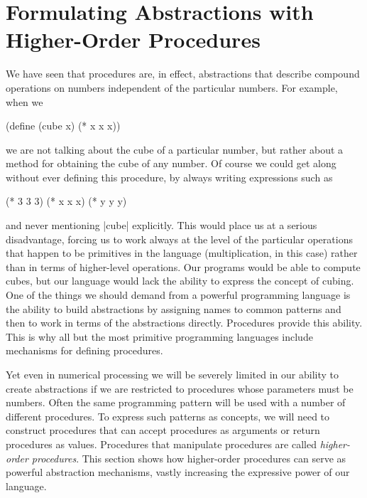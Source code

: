 
\section{Formulating Abstractions with Higher-Order Procedures}
\label{sec:1.3}




We have seen that procedures are, in effect, abstractions that describe
compound operations on numbers independent of the particular numbers.
For example, when we


\begin{schemedisplay}
(define (cube x) (* x x x))
\end{schemedisplay}
we are not talking about the cube of a particular number, but rather
about a method for obtaining the cube of any number.  Of course we
could get along without ever defining this procedure, by
always writing expressions such as

\begin{schemedisplay}
(* 3 3 3)
(* x x x)
(* y y y)        
\end{schemedisplay}
and never mentioning \scheme|cube| explicitly.  This would place us at
a serious disadvantage, forcing us to work always at the level of the
particular operations that happen to be primitives in the language
(multiplication, in this case) rather than in terms of higher-level
operations.  Our programs would be able to compute cubes, but our
language would lack the ability to express the concept of cubing.  One
of the things we should demand from a powerful programming language is
the ability to build abstractions by assigning names to common
patterns and then to work in terms of the abstractions directly.
Procedures provide this ability.  This is why all but the most
primitive programming languages include mechanisms for defining
procedures.

Yet even in numerical processing we will be severely limited in our
ability to create abstractions if we are restricted to procedures
whose parameters must be numbers.  Often the same programming pattern
will be used with a number of different procedures.  To express such
patterns as concepts, we will need to construct procedures that can
accept procedures as arguments or return procedures as values.
Procedures that manipulate procedures are called \textit{higher-order
  procedures}.  This section shows how higher-order procedures can
serve as powerful abstraction mechanisms, vastly increasing the
expressive power of our language.


